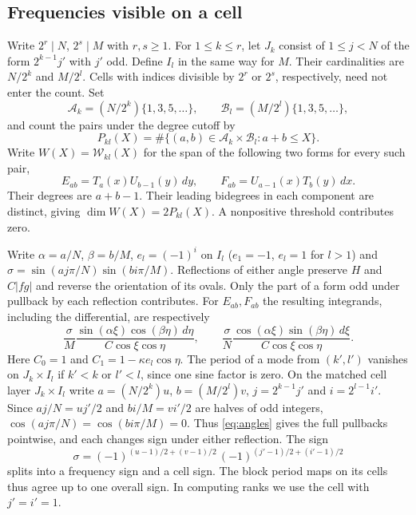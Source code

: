 \documentclass[11pt,a4paper]{amsart}
\numberwithin{equation}{section}
\newcommand{\W}{\mathcal W}
\newcommand{\B}{\mathcal B}
\newcommand{\A}{\mathcal A}
\begin{document}
\subsection{Frequencies visible on a cell}
Write $2^r\mid N$, $2^s\mid M$ with $r,s\ge1$. For $1\le k\le r$, let $J_k$ consist of $1\le j<N$ of the form $2^{k-1}j'$ with $j'$ odd. Define $I_l$ in the same way for $M$. Their cardinalities are $N/2^k$ and $M/2^l$. Cells with indices divisible by $2^r$ or $2^s$, respectively, need not enter the count. Set
\[
 \A_k=(N/2^k)\{1,3,5,\ldots\},\qquad
 \B_l=(M/2^l)\{1,3,5,\ldots\},
\]
and count the pairs under the degree cutoff by
\[
 P_{kl}(X)=\#\{(a,b)\in\A_k\times\B_l:a+b\le X\}.
\]
Write $W(X)=\W_{kl}(X)$ for the span of the following two forms for every such pair,
\begin{equation}\label{eq:modes}
 E_{ab}=T_a(x)U_{b-1}(y)\,dy,\qquad F_{ab}=U_{a-1}(x)T_b(y)\,dx .
\end{equation}
Their degrees are $a+b-1$. Their leading bidegrees in each component are distinct, giving $\dim W(X)=2P_{kl}(X)$. A nonpositive threshold contributes zero.

Write $\alpha=a/N$, $\beta=b/M$, $e_l=(-1)^i$ on $I_l$ ($e_1=-1$, $e_l=1$ for $l>1$) and $\sigma=\sin(aj\pi/N)\sin(bi\pi/M)$. Reflections of either angle preserve $H$ and $C|fg|$ and reverse the orientation of its ovals. Only the part of a form odd under pullback by each reflection contributes. For $E_{ab},F_{ab}$ the resulting integrands, including the differential, are respectively
\begin{equation}\label{eq:angles}
 \frac{\sigma}{M}\frac{\sin(\alpha\xi)\cos(\beta\eta)\,d\eta}{C\cos\xi\cos\eta},\qquad
 \frac{\sigma}{N}\frac{\cos(\alpha\xi)\sin(\beta\eta)\,d\xi}{C\cos\xi\cos\eta}.
\end{equation}
Here $C_0=1$ and $C_1=1-\kappa e_l\cos\eta$. The period of a mode from $(k',l')$ vanishes on $J_k\times I_l$ if $k'<k$ or $l'<l$, since one sine factor is zero. On the matched cell layer $J_k\times I_l$ write $a=(N/2^k)u$, $b=(M/2^l)v$, $j=2^{k-1}j'$ and $i=2^{l-1}i'$. Since $aj/N=uj'/2$ and $bi/M=vi'/2$ are halves of odd integers, $\cos(aj\pi/N)=\cos(bi\pi/M)=0$. Thus \eqref{eq:angles} gives the full pullbacks pointwise, and each changes sign under either reflection. The sign
\[
 \sigma=(-1)^{(u-1)/2+(v-1)/2}\,(-1)^{(j'-1)/2+(i'-1)/2}
\]
splits into a frequency sign and a cell sign. The block period maps on its cells thus agree up to one overall sign. In computing ranks we use the cell with $j'=i'=1$.
\end{document}
